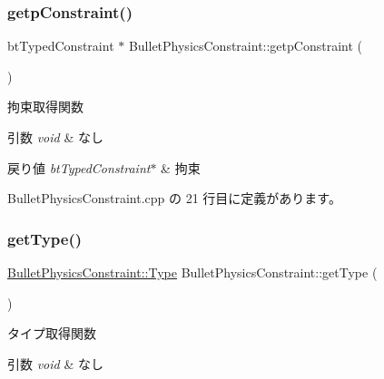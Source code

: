 \mbox{\label{class_bullet_physics_constraint_a9b010a354abcc093e48dc66edb1e22b7}} 
\subsubsection{\texorpdfstring{getp\+Constraint()}{getpConstraint()}}
{\footnotesize\ttfamily bt\+Typed\+Constraint $\ast$ Bullet\+Physics\+Constraint\+::getp\+Constraint (\begin{DoxyParamCaption}{ }\end{DoxyParamCaption})}



拘束取得関数 


\begin{DoxyParams}{引数}
{\em void} & なし \\
\hline
\end{DoxyParams}

\begin{DoxyRetVals}{戻り値}
{\em bt\+Typed\+Constraint$\ast$} & 拘束 \\
\hline
\end{DoxyRetVals}


 Bullet\+Physics\+Constraint.\+cpp の 21 行目に定義があります。

\mbox{\label{class_bullet_physics_constraint_a6d2bcb7b7a32a5ca14210a577a613b91}} 
\subsubsection{\texorpdfstring{get\+Type()}{getType()}}
{\footnotesize\ttfamily \mbox{\hyperlink{class_bullet_physics_constraint_ad85080d0a6ff58365f4f6fa4c9381e24}{Bullet\+Physics\+Constraint\+::\+Type}} Bullet\+Physics\+Constraint\+::get\+Type (\begin{DoxyParamCaption}{ }\end{DoxyParamCaption})}



タイプ取得関数 


\begin{DoxyParams}{引数}
{\em void} & なし \\
\hline
\end{DoxyParams}

